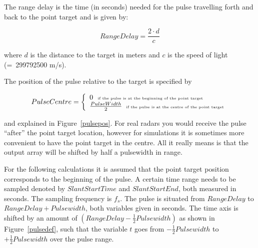 The range delay is the time (in seconds) needed for the pulse travelling
forth and back to the point target and is given by:

\begin{equation}
RangeDelay=\frac{2\cdot d}{c}
\end{equation}

where $d$ is the distance to the target in meters and $c$ is the speed of
light (=~299792500 m/s).

The position of the pulse relative to the target is specified by

\begin{equation}
PulseCentre=\left\{ 
\begin{array}{l}
0\text{ ~{\tiny if the pulse is at the beginning of the point target}} \\ 
\frac{PulseWidth}{2}~\text{{\tiny \ if the pulse is at the centre of the
point target}}
\end{array}
\right.
\end{equation}

and explained in Figure~\ref{pulsepos}. For real radars you would receive
the pulse ``after'' the point target location, however for simulations it is
sometimes more convenient to have the point target in the centre. All it
really means is that the output array will be shifted by half a pulsewidth
in range.


For the following calculations it is assumed that the point target position
corresponds to the beginning of the pulse. A certain time range needs to be
sampled denoted by $SlantStartTime$ and $SlantStartEnd$, both measured in
seconds. The sampling frequency is $f_{s}$. The pulse is situated from $%
RangeDelay$ to $RangeDelay+Pulsewidth$, both variables given in seconds. The
time axis is shifted by an amount of $\left( RangeDelay-\frac{1}{2}%
Pulsewidth\right) $ as shown in Figure~\ref{pulsedef}, such that the
variable $t$ goes from $-\frac{1}{2}Pulsewidth$ to $+\frac{1}{2}Pulsewidth$
over the pulse range.

